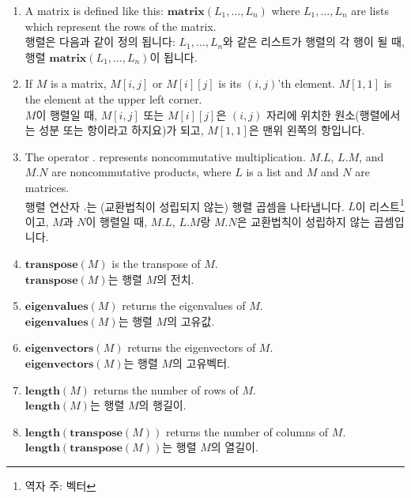 \documentclass[12pt]{article}
\begin{document}
\begin{enumerate}

\item A matrix is defined like this: $\mathbf{matrix}(L_1, \ldots, L_n)$
    where $L_1, \ldots, L_n$ are lists which represent the rows of the matrix. \\
        행렬은 다음과 같이 정의 됩니다: $L_1, \ldots, L_n$와 같은 리스트가 행렬의  각 행이 될 때,  행렬 $\mathbf{matrix}(L_1, \ldots, L_n)$이 됩니다.
    
\item If $M$ is a matrix, $M[i, j]$ or $M[i][j]$ is its $(i, j)$'th element.
    $M[1,1]$ is the element at the upper left corner. \\
    $M$이 행렬일 때, $M[i, j]$ 또는  $M[i][j]$은 $(i, j)$ 자리에 위치한 원소(행렬에서는 성분 또는 항이라고 하지요)가 되고, $M[1,1]$은 맨위 왼쪽의 항입니다.

\item The operator $\mathbf{.}$ represents noncommutative multiplication.
    $M . L$, $L . M$, and $M . N$ are noncommutative products,
    where $L$ is a list and $M$ and $N$ are matrices. \\
    행렬 연산자 $\mathbf{.}$는 (교환법칙이 성립되지 않는) 행렬 곱셈을 나타냅니다.
    $L$이 리스트\footnote{역자 주: 벡터}이고, $M$과 $N$이 행렬일 때, $M . L$, $L . M$랑  $M . N$은 교환법칙이 성립하지 않는 곱셈입니다.


\item $\mathbf{transpose}(M)$ is the transpose of $M$. \\
         $\mathbf{transpose}(M)$는 행렬 $M$의 전치.

\item $\mathbf{eigenvalues}(M)$ returns the eigenvalues of $M$. \\
         $\mathbf{eigenvalues}(M)$는 행렬 $M$의 고유값.

\item $\mathbf{eigenvectors}(M)$ returns the eigenvectors of $M$. \\
         $\mathbf{eigenvectors}(M)$는 행렬 $M$의 고유벡터.

\item $\mathbf{length}(M)$ returns the number of rows of $M$. \\
         $\mathbf{length}(M)$는 행렬 $M$의 행길이.

\item $\mathbf{length}(\mathbf{transpose}(M))$ returns the number of columns of $M$. \\
         $\mathbf{length}(\mathbf{transpose}(M))$는 행렬 $M$의 열길이.
\end{enumerate}
\end{document}
